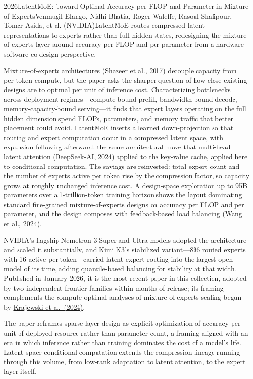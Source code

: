 
\begin{papersummary}{2026}{LatentMoE: Toward Optimal Accuracy per FLOP and Parameter in Mixture of Experts}{Venmugil Elango, Nidhi Bhatia, Roger Waleffe, Rasoul Shafipour, Tomer Asida, et al. (NVIDIA)}{LatentMoE routes compressed latent representations to experts rather than full hidden states, redesigning the mixture-of-experts layer around accuracy per FLOP and per parameter from a hardware--software co-design perspective.}

Mixture-of-experts architectures (\hyperref[paper:shazeer-2017-moe]{Shazeer et al., 2017}) decouple capacity from per-token compute, but the paper asks the sharper question of how close existing designs are to optimal per unit of inference cost. Characterizing bottlenecks across deployment regimes---compute-bound prefill, bandwidth-bound decode, memory-capacity-bound serving---it finds that expert layers operating on the full hidden dimension spend FLOPs, parameters, and memory traffic that better placement could avoid. LatentMoE inserts a learned down-projection so that routing and expert computation occur in a compressed latent space, with expansion following afterward: the same architectural move that multi-head latent attention (\hyperref[paper:deepseek-2024-v2]{DeepSeek-AI, 2024}) applied to the key-value cache, applied here to conditional computation. The savings are reinvested: total expert count and the number of experts active per token rise by the compression factor, so capacity grows at roughly unchanged inference cost. A design-space exploration up to 95B parameters over a 1-trillion-token training horizon shows the layout dominating standard fine-grained mixture-of-experts designs on accuracy per FLOP and per parameter, and the design composes with feedback-based load balancing (\hyperref[paper:wang-2024-auxfree]{Wang et al., 2024}).

NVIDIA's flagship Nemotron-3 Super and Ultra models adopted the architecture and scaled it substantially, and Kimi K3's stabilized variant---896 routed experts with 16 active per token---carried latent expert routing into the largest open model of its time, adding quantile-based balancing for stability at that width. Published in January 2026, it is the most recent paper in this collection, adopted by two independent frontier families within months of release; its framing complements the compute-optimal analyses of mixture-of-experts scaling begun by \hyperref[paper:krajewski-2024]{Krajewski et al.\ (2024)}.

The paper reframes sparse-layer design as explicit optimization of accuracy per unit of deployed resource rather than parameter count, a framing aligned with an era in which inference rather than training dominates the cost of a model's life. Latent-space conditional computation extends the compression lineage running through this volume, from low-rank adaptation to latent attention, to the expert layer itself.

\end{papersummary}
